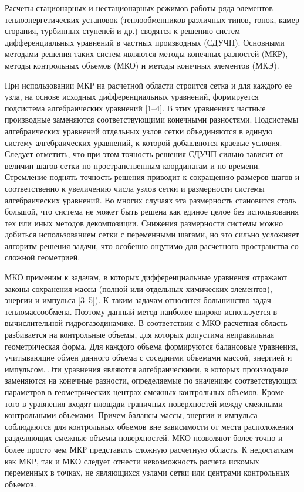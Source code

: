 \documentclass[a4paper,11pt,numreferences,mathsec,kaplist]{isuepsutf8}
\begin{document}
\begin{article}
Расчеты стационарных и нестационарных режимов работы ряда элементов
теплоэнергетических установок (теплообменников различных типов, топок,
камер сгорания, турбинных ступеней и др.) сводятся к решению систем
дифференциальных уравнений в частных производных (СДУЧП). Основными
методами решения таких систем являются методы конечных разностей (МКР),
методы контрольных объемов (МКО) и методы конечных элементов (МКЭ).  

При использовании МКР на расчетной области строится сетка и для каждого ее
узла, на основе исходных дифференциальных уравнений, формируется подсистема
алгебраических уравнений [1–4]. В этих уравнениях частные производные
заменяются соответствующими конечными разностями. Подсистемы алгебраических
уравнений отдельных узлов сетки объединяются в единую систему
алгебраических уравнений, к которой добавляются краевые условия. Следует
отметить, что при этом точность решения СДУЧП сильно зависит от величин
шагов сетки по пространственным координатам и по времени. Стремление
поднять точность решения приводит к сокращению размеров шагов и
соответственно к увеличению числа узлов сетки и размерности системы
алгебраических уравнений. Во многих случаях эта размерность становится
столь большой, что система не может быть решена как единое целое без
использования тех или иных методов декомпозиции.  Снижения размерности
системы можно добиться использованием сетки с переменными шагами, но это
сильно усложняет алгоритм решения задачи, что особенно ощутимо для
расчетного пространства со сложной геометрией.

МКО применим к задачам, в которых дифференциальные уравнения отражают
законы сохранения массы (полной или отдельных химических элементов),
энергии и импульса [3--5]). К таким задачам относится большинство задач
тепломассообмена.  Поэтому данный метод наиболее широко используется в
вычислительной гидрогазодинамике. В соответствии с МКО расчетная область
разбивается на контрольные объемы, для которых допустима неправильная
геометрическая форма.  Для каждого объема формируются балансовые уравнения,
учитывающие обмен данного объема с соседними объемами массой, энергией и
импульсом. Эти уравнения являются алгебраическими, в которых производные
заменяются на конечные разности, определяемые по значениям соответствующих
параметров в геометрических центрах смежных контрольных объемов. Кроме того
в уравнения входят площади граничных поверхностей между смежными
контрольными объемами. Причем балансы массы, энергии и импульса соблюдаются
для контрольных объемов вне зависимости от места расположения разделяющих
смежные объемы поверхностей. МКО позволяют более точно и более просто чем
МКР представить сложную расчетную область.  К недостаткам как МКР, так и
МКО следует отнести невозможность расчета искомых переменных в точках, не
являющихся узлами сетки или центрами контрольных объемов.


\end{article}
\end{document}
